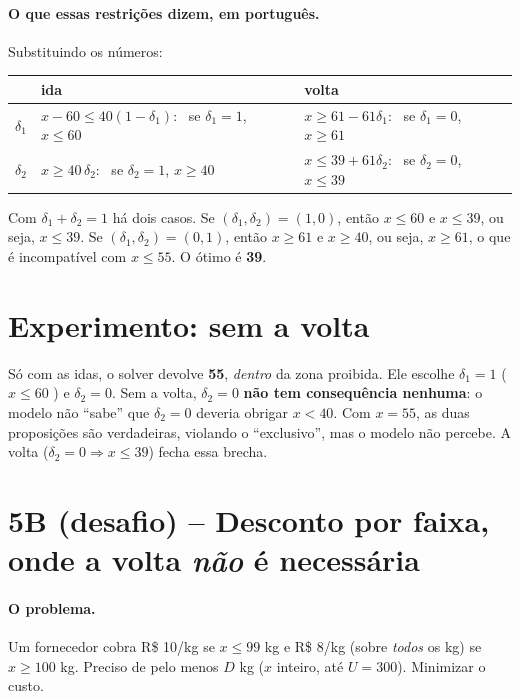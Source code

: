 \paragraph{O que essas restrições dizem, em português.} Substituindo os números:
\begin{center}
\begin{tabular}{lll}
\toprule
& ida & volta\\
\midrule
$\delta_1$ & $x-60\le40(1-\delta_1)$: \ se $\delta_1=1$, $x\le60$ & $x\ge61-61\delta_1$: \ se $\delta_1=0$, $x\ge61$\\
$\delta_2$ & $x\ge40\,\delta_2$: \ se $\delta_2=1$, $x\ge40$ & $x\le39+61\delta_2$: \ se $\delta_2=0$, $x\le39$\\
\bottomrule
\end{tabular}
\end{center}
Com $\delta_1+\delta_2=1$ há dois casos. Se $(\delta_1,\delta_2)=(1,0)$, então $x\le60$ e $x\le39$, ou seja,
$x\le39$. Se $(\delta_1,\delta_2)=(0,1)$, então $x\ge61$ e $x\ge40$, ou seja, $x\ge61$, o que é incompatível com
$x\le55$. O ótimo é \textbf{39}.

\section{Experimento: sem a volta}

Só com as idas, o solver devolve \textbf{55}, \emph{dentro} da zona proibida. Ele escolhe $\delta_1=1$ ($x\le60$
\checkmark) e $\delta_2=0$. Sem a volta, $\delta_2=0$ \textbf{não tem consequência nenhuma}: o modelo não ``sabe'' que
$\delta_2=0$ deveria obrigar $x<40$. Com $x=55$, as duas proposições são verdadeiras, violando o ``exclusivo'', mas o
modelo não percebe. A volta ($\delta_2=0\Rightarrow x\le39$) fecha essa brecha.

\section{5B (desafio) -- Desconto por faixa, onde a volta \emph{não} é necessária}

\paragraph{O problema.} Um fornecedor cobra R\$ 10/kg se $x\le99$ kg e R\$ 8/kg (sobre \emph{todos} os kg) se
$x\ge100$ kg. Preciso de pelo menos $D$ kg ($x$ inteiro, até $U=300$). Minimizar o custo.

